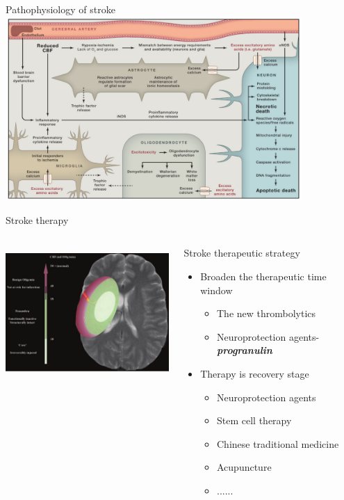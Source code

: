 \documentclass[bigger]{beamer}
\begin{document}
\begin{frame}[label={sec:orgheadline5}]{Pathophysiology of stroke}
\includegraphics[height=7cm,width=\textwidth]{b8}
\end{frame}
\begin{frame}[label={sec:orgheadline6}]{Stroke therapy}
\begin{columns}
\begin{column}{0.6\columnwidth}
\includegraphics[height=5cm,width=\textwidth]{b10}
\end{column}
\begin{column}{0.4\columnwidth}
\begin{block}{\pause \small Stroke therapeutic strategy}
\begin{itemize}
\item \footnotesize Broaden the therapeutic time window
\begin{itemize}
 \item \scriptsize The new thrombolytics
 \item \scriptsize Neuroprotection agents-\emph{\textbf{progranulin}}
\end{itemize}
\item \footnotesize Therapy is recovery stage
\begin{itemize}
 \item \scriptsize Neuroprotection agents
 \item \scriptsize Stem cell therapy
 \item \scriptsize Chinese traditional medicine
 \item \scriptsize Acupuncture
 \item \scriptsize ......
\end{itemize}
\end{itemize}
\end{block}
\end{column}
\end{columns}
\end{frame}
\end{document}
